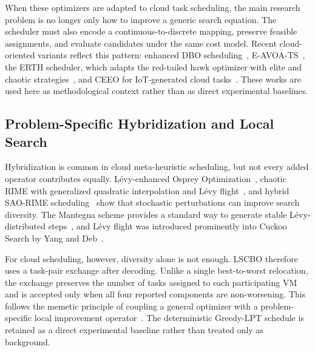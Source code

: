 \documentclass[pdflatex,onecolumn,sn-mathphys-num]{sn-jnl}
\begin{document}
When these optimizers are adapted to cloud task scheduling, the main research problem is no longer only how to improve a generic search equation. The scheduler must also encode a continuous-to-discrete mapping, preserve feasible assignments, and evaluate candidates under the same cost model. Recent cloud-oriented variants reflect this pattern: enhanced DBO scheduling~\cite{Xie2024}, E-AVOA-TS~\cite{Ghafari2023}, the ERTH scheduler, which adapts the red-tailed hawk optimizer with elite and chaotic strategies~\cite{Ferahtia2023,Qin2024}, and CEEO for IoT-generated cloud tasks~\cite{EbrahimiMood2025}. These works are used here as methodological context rather than as direct experimental baselines.

\subsection{Problem-Specific Hybridization and Local Search}
Hybridization is common in cloud meta-heuristic scheduling, but not every added operator contributes equally. L\'{e}vy-enhanced Osprey Optimization~\cite{Chintale2024,Dehghani2023}, chaotic RIME with generalized quadratic interpolation and L\'{e}vy flight~\cite{Sabipour2025}, and hybrid SAO-RIME scheduling~\cite{Zhu2025} show that stochastic perturbations can improve search diversity. The Mantegna scheme provides a standard way to generate stable L\'{e}vy-distributed steps~\cite{Mantegna1994}, and L\'{e}vy flight was introduced prominently into Cuckoo Search by Yang and Deb~\cite{Yang2009}.

For cloud scheduling, however, diversity alone is not enough. LSCBO therefore uses a task-pair exchange after decoding. Unlike a single best-to-worst relocation, the exchange preserves the number of tasks assigned to each participating VM and is accepted only when all four reported components are non-worsening. This follows the memetic principle of coupling a general optimizer with a problem-specific local improvement operator~\cite{Moscato1989}. The deterministic Greedy-LPT schedule is retained as a direct experimental baseline rather than treated only as background.
\end{document}
